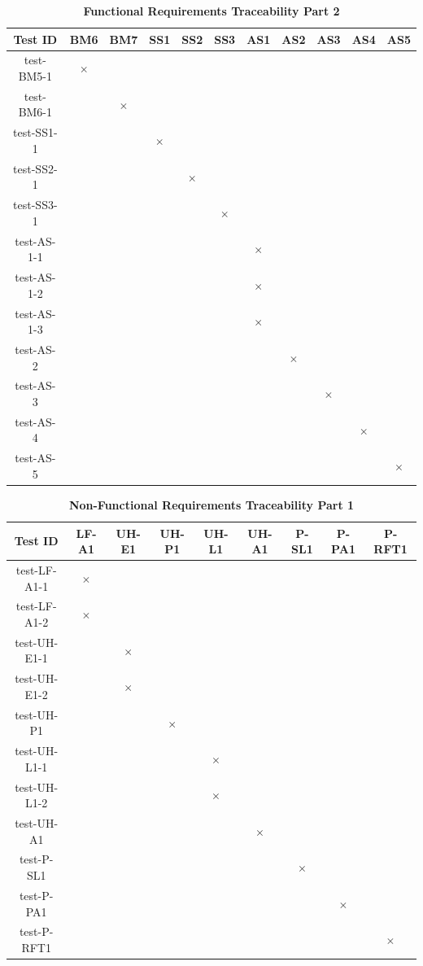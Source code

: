 \documentclass[12pt, titlepage]{article}
\begin{document}
\begin{table}[H]
\centering
\begin{tabular}{|c|c|c|c|c|c|c|c|c|c|c|}
\hline
Test ID & BM6 & BM7 & SS1 & SS2 & SS3 & AS1 & AS2 & AS3 & AS4 & AS5 \\
\hline 
test-BM5-1 & $\times$ & & & & & & & & & \\
test-BM6-1 & & $\times$ & & & & & & & & \\
test-SS1-1 & & & $\times$ & & & & & & & \\
test-SS2-1 & & & & $\times$ & & & & & & \\
test-SS3-1 & & & & & $\times$ & & & & & \\
test-AS-1-1 & & & & & &  $\times$ & & &  & \\
test-AS-1-2 & & & & & &  $\times$ & & &  & \\
test-AS-1-3 & & & & & &  $\times$ & & &  & \\
test-AS-2 & & & & & &   & $\times$ & &  & \\
test-AS-3 & & & & & & & & $\times$ &  & \\
test-AS-4 & & & & & & & & & $\times$ & \\
test-AS-5 & & & & & & & & & & $\times$ \\


\hline
\end{tabular}
\caption{\bf Functional Requirements Traceability Part 2}
\end{table}


\begin{table}[H]
\centering
\begin{tabular}{|c|c|c|c|c|c|c|c|c|}
\hline
Test ID & LF-A1 & UH-E1 & UH-P1 & UH-L1 & UH-A1 & P-SL1 & P-PA1 & P-RFT1 \\
\hline 
test-LF-A1-1 & $\times$ & & & & & & &   \\
test-LF-A1-2 & $\times$  & & & & & & &   \\
test-UH-E1-1 &  & $\times$  & & & & & &   \\
test-UH-E1-2 &  & $\times$  & & & & & &   \\
test-UH-P1 &  &  & $\times$  & & & & &   \\
test-UH-L1-1 &  & & & $\times$  & & & &   \\
test-UH-L1-2 &  & & & $\times$  & & & &   \\
test-UH-A1 &  &  & & & $\times$   & & &   \\
test-P-SL1 &  &  & & &    & $\times$ & &   \\
test-P-PA1 &  &  & & &    &  & $\times$ &   \\
test-P-RFT1 &  &  & & &    &  &  & $\times$  \\
\hline
\end{tabular}
\caption{\bf Non-Functional Requirements Traceability Part 1}
\end{table}
\end{document}
